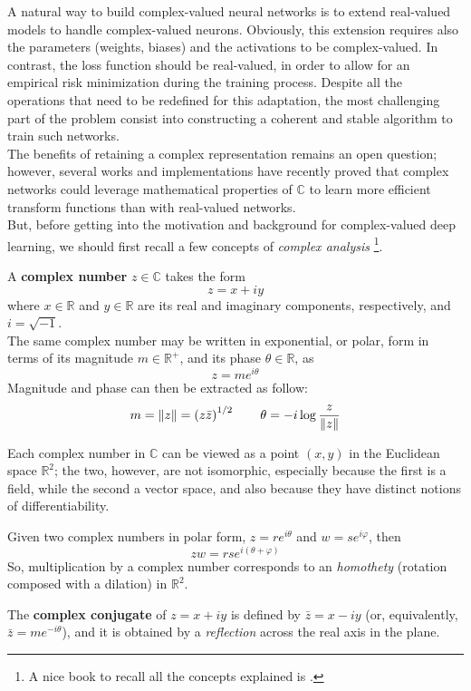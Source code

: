 \documentclass[../main.tex]{subfiles}
\begin{document}
A natural way to build complex-valued neural networks is to extend real-valued models to handle complex-valued neurons. Obviously, this extension requires also the parameters (weights, biases) and the activations to be complex-valued. In contrast, the loss function should be real-valued, in order to allow for an empirical risk minimization during the training process. Despite all the operations that need to be redefined for this adaptation, the most challenging part of the problem consist into constructing a coherent and stable algorithm to train such networks.\\
The benefits of retaining a complex representation remains an open question; however, several works and implementations have recently proved that complex networks could leverage mathematical properties of $\mathds{C}$ to learn more efficient transform functions than with real-valued networks.\\
But, before getting into the motivation and background for complex-valued deep learning, we should first recall a few concepts of \textit{complex analysis} \footnote{A nice book to recall all the concepts explained is \cite{stein_complex_analysis}.}. 
\begin{definition}
A \textbf{complex number} $z\in\mathds{C}$ takes the form 
\[ z = x+iy \] 
where $x\in\mathds{R}$ and $y\in\mathds{R}$ are its real and imaginary components, respectively, and $i = \sqrt{-1}$.\\
 The same complex number may be written in exponential, or polar, form in terms of its magnitude $m\in\mathds{R}^+$, and its phase $\theta\in\mathds{R}$, as 
\[ z = me^{i\theta} \]
Magnitude and phase can then be extracted as follow:
\[ m = \norm{z} = \left(z\bar{z}\right)^{1/2} \qquad \theta = -i\log\frac{z}{\norm{z}} \]
\end{definition}
Each complex number in $\mathds{C}$ can be viewed as a point $(x,y)$ in the Euclidean space $\mathds{R}^2$; the two, however, are not isomorphic, especially because the first is a field, while the second a vector space, and also because they have distinct notions of differentiability.
\begin{observation}
Given two complex numbers in polar form, $z=re^{i\theta}$ and $w=se^{i\varphi}$, then 
\[ zw = rse^{i(\theta+\varphi)} \]
So, multiplication by a complex number corresponds to an \textit{homothety} (rotation composed with a dilation) in $\mathds{R}^2$.
\label{obs:cmplx_mult_homothety} 
\end{observation}
\begin{definition}
The \textbf{complex conjugate} of $z = x+iy$ is defined by $\bar{z} = x-iy$ (or, equivalently, $\bar{z}=me^{-i\theta}$), and it is obtained by a \textit{reflection} across the real axis in the plane.
\end{definition}
\end{document}
